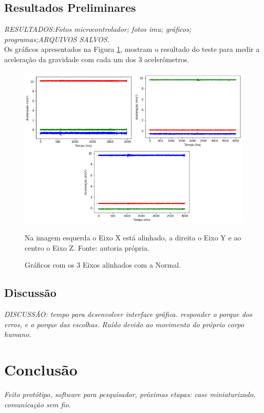 	\section{Resultados Preliminares}
	\textit{RESULTADOS:Fotos microcontrolador; fotos imu; gráficos; programas;ARQUIVOS SALVOS.}\\
	
	Os gráficos apresentados na Figura \ref{acelx_0}, mostram o resultado do teste para medir a aceleração da gravidade com cada um dos 3 acelerômetros.
	
	\begin{figure}[h]
		\centering
		\includegraphics[keepaspectratio=true,scale=0.6]{figuras/graficos_acel.png}
		\caption{Gráficos com os 3 Eixos alinhados com a Normal.}
		Na imagem esquerda o Eixo X está alinhado, a direita o Eixo Y e ao centro o Eixo Z. \footnotesize
		Fonte: autoria própria. 
		\label{acelx_0}	
	\end{figure}		
	\section{Discussão}		
	\textit{DISCUSSÃO: tempo para desenvolver interface gráfica. responder o porque dos erros, e o porque das escolhas. Ruído devido ao movimento do próprio corpo humano. 	
	}
\chapter{Conclusão}
	
	\textit{Feito protótipo, software para pesquisador, próximas etapas: case miniaturizado, comunicação sem fio.}